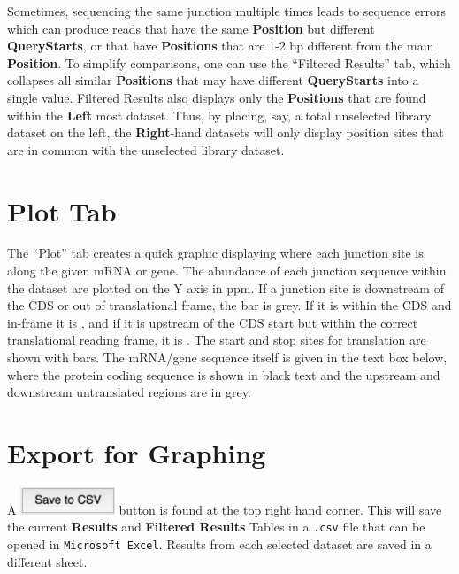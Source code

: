 \documentclass[11pt,fleqn]{book} %
\begin{document}
Sometimes, sequencing the same junction multiple times leads to sequence errors which can produce reads that have the same \textbf{Position} but different \textbf{QueryStarts}, or that have \textbf{Positions} that are 1-2 bp different from the main \textbf{Position}.  To simplify comparisons, one can use the ``Filtered Results'' tab, which collapses all similar \textbf{Positions} that may have different \textbf{QueryStarts} into a single value. Filtered Results also displays only the \textbf{Positions} that are found within the \textbf{Left} most dataset. Thus, by placing, say, a total unselected library dataset on the left, the \textbf{Right}-hand datasets will only display position sites that are in common with the unselected library dataset.


\section{Plot Tab}

The ``Plot'' tab creates a quick graphic displaying where each junction site is along the given mRNA or gene.  The abundance of each junction sequence within the dataset are plotted on the Y axis in ppm. If a junction site is downstream of the CDS or out of translational frame, the bar is grey.  If it is within the CDS and in-frame it is {\color{RoyalBlue}{dark blue}}, and if it is upstream of the CDS start but within the correct translational reading frame, it is {\color{cyan}{cyan}}.  The start and stop sites for translation are shown with {\color{red}{red}} bars. The mRNA/gene sequence itself is given in the text box below, where the protein coding sequence is shown in black text and the upstream and downstream untranslated regions are in grey.

\section{Export for Graphing}

A \includegraphics[width=80pt]{Pictures/save_csv_btn} button is found at the top right hand corner.
This will save the current \textbf{Results} and \textbf{Filtered Results} Tables in a \texttt{.csv} file that can be opened in \texttt{Microsoft Excel}. Results from each selected dataset are saved in a different sheet.
\end{document}
